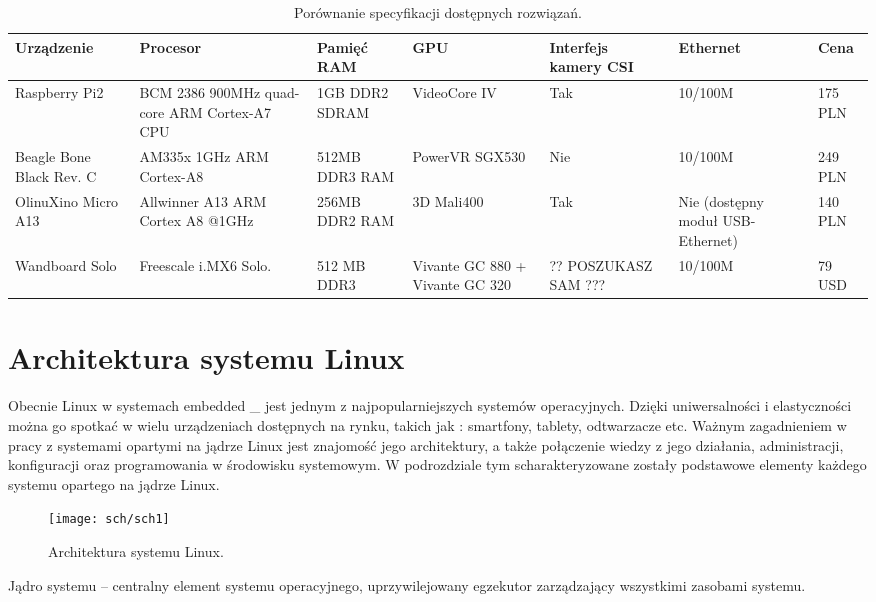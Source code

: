 \begin{table}[b!]
\caption[Porównanie specyfikacji dostępnych rozwiązań.]{Porównanie specyfikacji dostępnych rozwiązań.}
\begin{tabularx}{\textwidth}{|lXXXXXX|} 
 \midrule
Urządzenie        & Procesor &Pamięć RAM & GPU & Interfejs kamery CSI & Ethernet & Cena \\
 \midrule
Raspberry Pi2       &  BCM 2386 900MHz quad-core ARM Cortex-A7 CPU &  1GB DDR2 SDRAM   &                     VideoCore IV &     Tak     &    10/100M  &  175 PLN\\
Beagle Bone Black Rev. C & AM335x 1GHz ARM Cortex-A8 & 512MB DDR3 RAM & PowerVR SGX530 & Nie & 10/100M & 249 PLN \\
OlinuXino Micro A13 & Allwinner A13 ARM Cortex A8 @1GHz & 256MB DDR2 RAM & 3D Mali400 & Tak & Nie (dostępny moduł USB-Ethernet)& 140 PLN \\
Wandboard Solo & Freescale i.MX6 Solo. & 512 MB DDR3 & Vivante GC 880 + Vivante GC 320 & ?? POSZUKASZ SAM ??? & 10/100M & 79 USD \\
\bottomrule
\end{tabularx}  
\label{tab:compareAnalysers}
\end{table}


\section{Architektura systemu Linux}
Obecnie Linux w systemach embedded \_ jest jednym z najpopularniejszych systemów operacyjnych. Dzięki uniwersalności i elastyczności można go spotkać w wielu urządzeniach dostępnych na rynku, takich jak : smartfony, tablety, odtwarzacze etc. Ważnym zagadnieniem w pracy z systemami opartymi na jądrze Linux jest znajomość jego architektury, a także połączenie wiedzy z  jego działania, administracji, konfiguracji oraz programowania w środowisku systemowym. W podrozdziale tym scharakteryzowane zostały podstawowe elementy każdego systemu opartego na jądrze Linux.

\begin{figure}[bth]
\centering
{\texttt{[image: sch/sch1]}}
\caption[Architektura systemu Linux.]{Architektura systemu Linux.}
\label{fig:sch1}
\end{figure}

Jądro systemu – centralny element systemu operacyjnego, uprzywilejowany egzekutor zarządzający wszystkimi zasobami systemu. 

